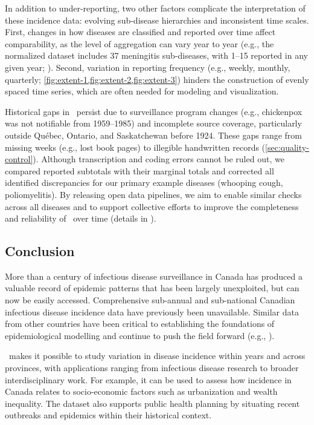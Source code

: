 \documentclass[12pt]{article}
\begin{document}
In addition to under-reporting, two other factors complicate the interpretation of these incidence data: evolving sub-disease hierarchies and inconsistent time scales. First, changes in how diseases are classified and reported over time affect comparability, as the level of aggregation can vary year to year (e.g., the normalized dataset includes 37 meningitis sub-diseases, with 1--15 reported in any given year; ). Second, variation in reporting frequency (e.g., weekly, monthly, quarterly; \cref{fig:extent-1,fig:extent-2,fig:extent-3}) hinders the construction of evenly spaced time series, which are often needed for modeling and visualization.

Historical gaps in \datacronym\ persist due to surveillance program changes (e.g., chickenpox was not notifiable from 1959--1985) and incomplete source coverage, particularly outside Québec, Ontario, and Saskatchewan before 1924. These gaps range from missing weeks (e.g., lost book pages) to illegible handwritten records (\cref{sec:quality-control}). Although transcription and coding errors cannot be ruled out, we compared reported subtotals with their marginal totals and corrected all identified discrepancies for our primary example diseases (whooping cough, poliomyelitis). By releasing open data pipelines, we aim to enable similar checks across all diseases and to support collective efforts to improve the completeness and reliability of \datacronym\ over time (details in ).

\subsection{Conclusion}

More than a century of infectious disease surveillance in Canada has produced a valuable record of epidemic patterns that has been largely unexploited, but can now be easily accessed. Comprehensive sub-annual and sub-national Canadian infectious disease incidence data have previously been unavailable. Similar data from other countries have been critical to establishing the foundations of epidemiological modelling and continue to push the field forward (e.g., \cite{bartlett1960critical,london1973recurrent,anderson1982directly,fine1982measles,grenfell1985pertussis,AndeMay91,Tien+11,KrylEarn20,Earn+20}).

\datacronym\ makes it possible to study variation in disease incidence within years and across provinces, with applications ranging from infectious disease research to broader interdisciplinary work. For example, it can be used to assess how incidence in Canada relates to socio-economic factors such as urbanization and wealth inequality. The dataset also supports public health planning by situating recent outbreaks and epidemics within their historical context.
\end{document}
